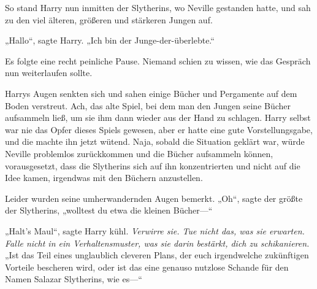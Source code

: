 So stand Harry nun inmitten der Slytherins, wo Neville gestanden hatte, und sah zu den viel älteren, größeren und stärkeren Jungen auf.

„Hallo“, sagte Harry. „Ich bin der Junge-der-überlebte.“

Es folgte eine recht peinliche Pause. Niemand schien zu wissen, wie das Gespräch nun weiterlaufen sollte.

Harrys Augen senkten sich und sahen einige Bücher und Pergamente auf dem Boden verstreut. Ach, das alte Spiel, bei dem man den Jungen seine Bücher aufsammeln ließ, um sie ihm dann wieder aus der Hand zu schlagen. Harry selbst war nie das Opfer dieses Spiels gewesen, aber er hatte eine gute Vorstellungsgabe, und die machte ihn jetzt wütend. Naja, sobald die Situation geklärt war, würde Neville problemlos zurückkommen und die Bücher aufsammeln können, vorausgesetzt, dass die Slytherins sich auf ihn konzentrierten und nicht auf die Idee kamen, irgendwas mit den Büchern anzustellen.

Leider wurden seine umherwandernden Augen bemerkt. „Oh“, sagte der größte der Slytherins, „wolltest du etwa die kleinen Bücher—“

„Halt’s Maul“, sagte Harry kühl. \emph{Verwirre sie. Tue nicht das, was sie erwarten. Falle nicht in ein Verhaltensmuster, was sie darin bestärkt, dich zu schikanieren.} „Ist das Teil eines unglaublich cleveren Plans, der euch irgendwelche zukünftigen Vorteile bescheren wird, oder ist das eine genauso nutzlose Schande für den Namen Salazar Slytherins, wie es—“

